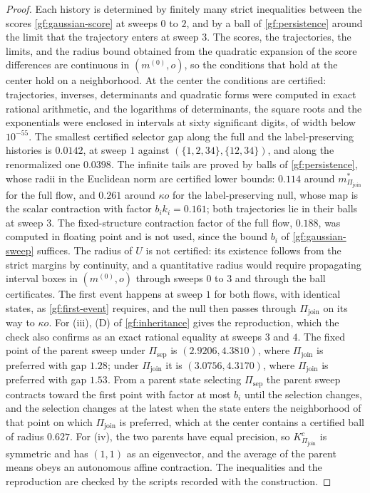 \begin{proof}
Each history is determined by finitely many strict inequalities between the
scores \cref{gf:gaussian-score} at sweeps $0$ to $2$, and by a ball of
\cref{gf:persistence} around the limit that the trajectory enters at
sweep $3$. The scores, the trajectories, the limits, and the radius bound
obtained from the quadratic expansion of the score differences are continuous
in $(m^{(0)},o)$, so the conditions that hold at the center hold on a
neighborhood. At the center the conditions are certified: trajectories,
inverses, determinants and quadratic forms were computed in exact rational
arithmetic, and the logarithms of determinants, the square roots and the
exponentials were enclosed in intervals at sixty significant digits, of width
below $10^{-55}$. The smallest certified selector gap along the full and the
label-preserving histories is $0.0142$, at sweep $1$ against
$(\{1,2,34\},\{12,34\})$, and along the renormalized one $0.0398$. The
infinite tails are proved by balls of \cref{gf:persistence}, whose radii in
the Euclidean norm are certified lower bounds: $0.114$ around
$m^*_{\Pi_{\mathrm{join}}}$ for the full flow, and $0.261$ around $\kappa o$
for the label-preserving null, whose map is the scalar contraction with
factor $b_ik_i=0.161$; both trajectories lie in their balls at sweep $3$.
The fixed-structure contraction factor of the full flow, $0.188$, was
computed in floating point and is not used, since the bound $b_i$ of
\cref{gf:gaussian-sweep} suffices. The radius of $U$ is not certified: its
existence follows from the strict margins by continuity, and a quantitative
radius would require propagating interval boxes in $(m^{(0)},o)$ through
sweeps $0$ to $3$ and through the ball certificates. The
first event happens at sweep $1$ for both flows, with identical states, as
\cref{gf:first-event} requires, and the null then passes through
$\Pi_{\mathrm{join}}$ on its way to $\kappa o$. For (iii), (D) of
\cref{gf:inheritance} gives the reproduction, which the check also confirms
as an exact rational equality at sweeps $3$ and $4$. The fixed point of the parent sweep under $\Pi_{\mathrm{sep}}$
is $(2.9206,4.3810)$, where $\Pi_{\mathrm{join}}$ is preferred with gap
$1.28$; under $\Pi_{\mathrm{join}}$ it is $(3.0756,4.3170)$, where
$\Pi_{\mathrm{join}}$ is preferred with gap $1.53$. From a parent state
selecting $\Pi_{\mathrm{sep}}$ the parent sweep contracts toward the first
point with factor at most $b_i$ until the selection changes, and the
selection changes at the latest when the state enters the neighborhood of
that point on which $\Pi_{\mathrm{join}}$ is preferred, which at the center
contains a certified ball of radius $0.627$. For (iv), the two
parents have equal precision, so $K^c_{\Pi_{\mathrm{join}}}$ is symmetric and
has $(1,1)$ as an eigenvector, and the average of the parent means obeys an
autonomous affine contraction. The inequalities and the reproduction are
checked by the scripts recorded with the construction.
\end{proof}

